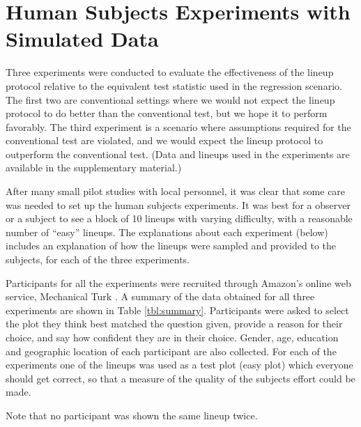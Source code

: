\documentclass[12pt]{article}
\newcommand{\blue}[1]{{\color{blue} #1}} %
\newcommand{\green}[1]{{\color{green} #1}} %
\begin{document}
\section{Human Subjects Experiments with Simulated Data} \label{sec:simulation}

Three experiments were conducted to evaluate the effectiveness of the lineup protocol relative to the equivalent test statistic used in the regression scenario. The first two are conventional settings where we would not expect the lineup protocol to do better than the conventional test, but we hope it to perform favorably. The third experiment is a scenario where assumptions required for the conventional test are violated, and we would expect the lineup protocol to outperform the conventional test. (Data and lineups used in the experiments are available in the supplementary material.)

After many small pilot studies with local personnel, it was clear that some care was needed to set up the human subjects experiments. It was best for a observer or a subject to see a block of 10 lineups with varying difficulty, with a reasonable number of ``easy'' lineups. The explanations about each experiment (below) includes an explanation of how the lineups were sampled and provided to the subjects, for each of the three experiments.

Participants for all the experiments were recruited through Amazon's online web service, Mechanical Turk  \citep{turk}. A summary of the data obtained for all three experiments are shown in Table \ref{tbl:summary}. Participants were asked to select the plot they think best matched the question given, provide a reason for their choice, and say how confident they are in their choice. Gender, age, education and geographic location of each participant are also collected. %
For each of the experiments one of the lineups was used as a test plot (easy plot) which everyone should get correct, so that a measure of the quality of the subjects effort could be made. 

Note that no participant was shown the same lineup twice.
\end{document}
